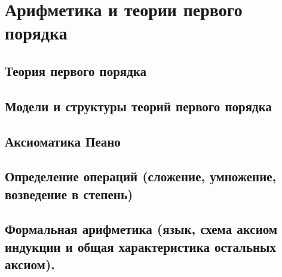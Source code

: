 \documentclass[english]{article}
\theoremstyle{plain}
\theoremstyle{remark}
\theoremstyle{definition}
\begin{document}
\section{Арифметика и теории первого порядка}
\label{sec:orgf9aadd9}
\subsection{Теория первого порядка}
\label{sec:org29a6007}
\subsection{Модели и структуры теорий первого порядка}
\label{sec:org3276e5a}
\subsection{Аксиоматика Пеано}
\label{sec:org11b7638}
\subsection{Определение операций (сложение, умножение, возведение в степень)}
\label{sec:org7919981}
\subsection{Формальная арифметика (язык, схема аксиом индукции и общая характеристика остальных аксиом).}
\label{sec:orge746623}
\end{document}

